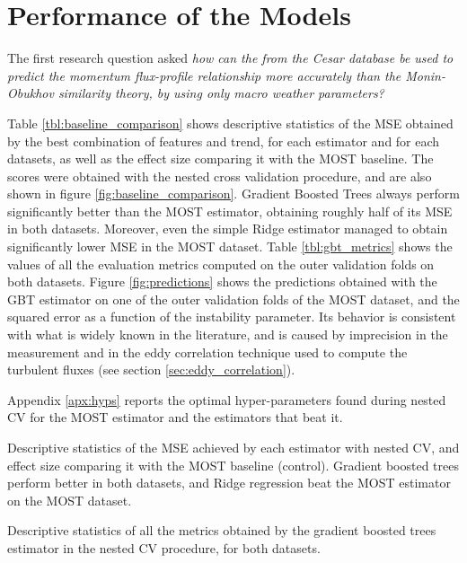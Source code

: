 \documentclass[a4paper,11pt]{kth-mag}
\begin{document}
 \section{Performance of the Models}
\label{sec:model_perf}
The first research question asked \emph{how can the from the Cesar database be used to predict the momentum flux-profile relationship more accurately than the Monin-Obukhov similarity theory, by using only macro weather parameters?}

Table \ref{tbl:baseline_comparison} shows descriptive statistics of the MSE obtained by the best combination of features and trend, for each estimator and for each datasets, as well as the effect size comparing it with the MOST baseline. The scores were obtained with the nested cross validation procedure, and are also shown in figure \ref{fig:baseline_comparison}. Gradient Boosted Trees always perform significantly better than the MOST estimator, obtaining roughly half of its MSE in both datasets. Moreover, even the simple Ridge estimator managed to obtain significantly lower MSE in the MOST dataset. Table \ref{tbl:gbt_metrics} shows the values of all the evaluation metrics computed on the outer validation folds on both datasets. Figure \ref{fig:predictions} shows the predictions obtained with the GBT estimator on one of the outer validation folds of the MOST dataset, and the squared error as a function of the instability parameter. Its behavior is consistent with what is widely known in the literature, and is caused by imprecision in the measurement and in the eddy correlation technique used to compute the turbulent fluxes (see section \ref{sec:eddy_correlation}).

Appendix \ref{apx:hyps} reports the optimal hyper-parameters found during nested CV for the MOST estimator and the estimators that beat it.

\begin{table}
\caption{Descriptive statistics of the MSE achieved by each estimator with nested CV, and effect size comparing it with the MOST baseline (control). Gradient boosted trees perform better in both datasets, and Ridge regression beat the MOST estimator on the MOST dataset.}
\label{tbl:baseline_comparison}

\end{table}



\begin{table}
\caption{Descriptive statistics of all the metrics obtained by the gradient boosted trees estimator in the nested CV procedure, for both datasets.}
\label{tbl:gbt_metrics}

\end{table}
\end{document}

